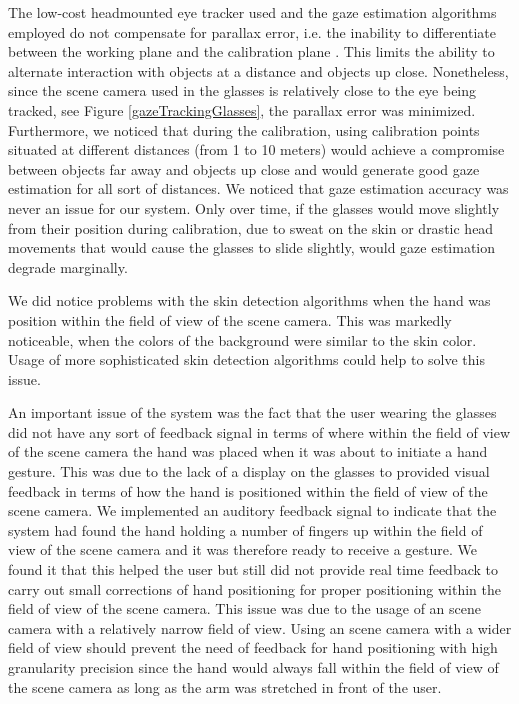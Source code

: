 \documentclass[jou,a4paper,notxfonts]{apa}
\begin{document}
The low-cost headmounted eye tracker used and the gaze estimation algorithms employed do not compensate for parallax
error, i.e. the inability to differentiate between the working plane and the calibration plane
\cite{mardanbegi2012parallax}. This limits the ability to alternate interaction with objects at a distance and objects
up close. Nonetheless, since the scene camera used in the glasses is relatively close to the eye being tracked, see Figure
\ref{gazeTrackingGlasses}, the parallax error was minimized. Furthermore, we noticed that during the calibration, using                                                                                                                                                                                                                                                                                                                                                                                                                                 
calibration points situated at different distances (from 1 to 10 meters) would achieve a compromise between objects
far away and objects up close and would generate good gaze estimation for all sort of distances. We noticed that
gaze estimation accuracy was never an issue for our system. Only over time, if the glasses would move slightly from
their position during calibration, due to sweat on the skin or drastic head movements that would cause the glasses to slide slightly, would gaze estimation degrade marginally.


We did notice problems with the skin detection algorithms when the hand was position within the field of view of the
scene camera. This was markedly noticeable, when the colors of the background were similar to the skin color. Usage of
more sophisticated skin detection algorithms could help to solve this issue.


An important issue of the system was the fact that the user wearing the glasses did not have any sort of feedback signal in
terms of where within the field of view of the scene camera the hand was placed when it was about to initiate a hand
gesture. This was due to the lack of a display on the glasses to provided visual feedback in terms of how the hand is
positioned within the field of view of the scene camera. We implemented an auditory feedback signal to indicate
that the system had found the hand holding a number of fingers up within the field of view of the scene camera and it was therefore ready to receive a
gesture. We found it that this helped the user but still did not provide real time feedback to carry out small
corrections of hand positioning for proper positioning within the field of view of the scene camera. This issue was due
to the usage of an scene camera with a relatively narrow field of view. Using an scene camera with a wider field of view
should prevent the need of feedback for hand positioning with high granularity precision since the hand would always fall within the field of view of the scene camera as long as the arm was stretched in front of the user.
 
\end{document}

